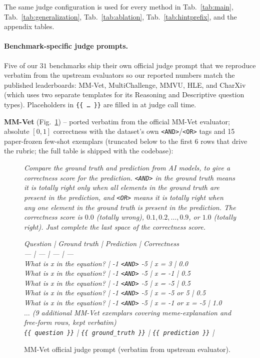 \documentclass{llmxive}
\begin{document}
The same judge configuration is used for every method in Tab.~\ref{tab:main}, Tab.~\ref{tab:generalization}, Tab.~\ref{tab:ablation}, Tab.~\ref{tab:hintprefix}, and the appendix tables.

\paragraph{Benchmark-specific judge prompts.}
Five of our $31$ benchmarks ship their own official judge prompt that we reproduce verbatim from the upstream evaluators so our reported numbers match the published leaderboards: MM-Vet, MultiChallenge, MMVU, HLE, and CharXiv (which uses two separate templates for its Reasoning and Descriptive question types). Placeholders in \texttt{\{\{\,\dots\,\}\}} are filled in at judge call time.

\textbf{MM-Vet} (Fig.~\ref{fig:prompt-judge-mmvet}) -- ported verbatim from the official MM-Vet evaluator; absolute $[0,1]$ correctness with the dataset's own \texttt{<AND>}/\texttt{<OR>} tags and 15 paper-frozen few-shot exemplars (truncated below to the first 6 rows that drive the rubric; the full table is shipped with the codebase):
\begin{figure}[!htbp]
\begin{prompttemplatefig}
\small
\emph{Compare the ground truth and prediction from AI models, to give a correctness score for the prediction. \texttt{<AND>} in the ground truth means it is totally right only when all elements in the ground truth are present in the prediction, and \texttt{<OR>} means it is totally right when any one element in the ground truth is present in the prediction. The correctness score is $0.0$ (totally wrong), $0.1, 0.2, \dots, 0.9$, or $1.0$ (totally right). Just complete the last space of the correctness score.}

\emph{Question | Ground truth | Prediction | Correctness}\\
\emph{--- | --- | --- | ---}\\
\emph{What is x in the equation? | -1 \texttt{<AND>} -5 | x = 3 | 0.0}\\
\emph{What is x in the equation? | -1 \texttt{<AND>} -5 | x = -1 | 0.5}\\
\emph{What is x in the equation? | -1 \texttt{<AND>} -5 | x = -5 | 0.5}\\
\emph{What is x in the equation? | -1 \texttt{<AND>} -5 | x = -5 or 5 | 0.5}\\
\emph{What is x in the equation? | -1 \texttt{<AND>} -5 | x = -1 or x = -5 | 1.0}\\
\emph{$\dots$ (9 additional MM-Vet exemplars covering meme-explanation and free-form rows, kept verbatim)}\\
\emph{\texttt{\{\{ question \}\}} | \texttt{\{\{ ground\_truth \}\}} | \texttt{\{\{ prediction \}\}} |}
\end{prompttemplatefig}
\caption{MM-Vet official judge prompt (verbatim from upstream evaluator).}
\label{fig:prompt-judge-mmvet}
\end{figure}
\end{document}
